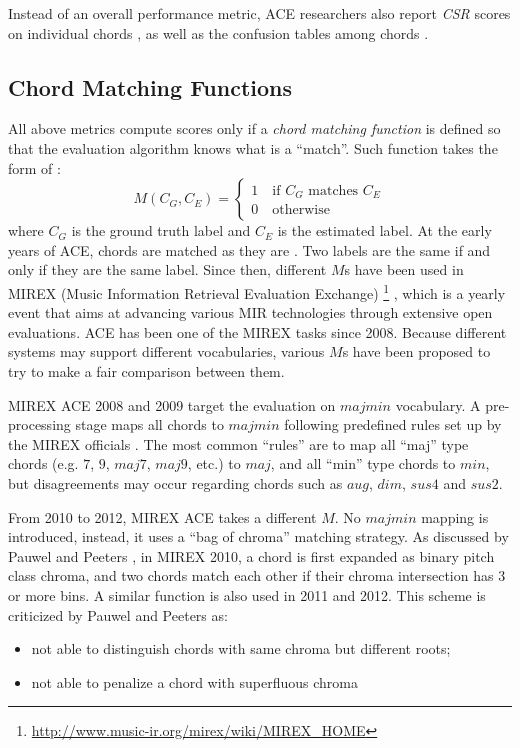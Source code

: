 Instead of an overall performance metric, ACE researchers also report \textit{CSR} scores on individual chords \cite{mauch2010automatic,deng2016chord}, as well as the confusion tables among chords \cite{mauch2010automatic,oudre2010template,papadopoulos2010joint,khadkevich2011music,deng2016hybrid}.

\subsection{Chord Matching Functions}\label{sec:2-chordmatch}
All above metrics compute scores only if a {\it chord matching function} is defined so that the evaluation algorithm knows what is a ``match''. Such function takes the form of \cite{harte2010towards}:
\begin{equation}
M(C_G,C_E)=
\begin{cases}
1 \quad \text{if $C_G$ matches $C_E$} \\
0 \quad \text{otherwise}
\end{cases}
\end{equation}
where $C_G$ is the ground truth label and $C_E$ is the estimated label. At the early years of ACE, chords are matched as they are \cite{fujishima1999realtime,sheh2003chord,bello2005robust}. Two labels are the same if and only if they are the same label. Since then, different $M$s have been used in MIREX (Music Information Retrieval Evaluation Exchange) \footnote{\url{http://www.music-ir.org/mirex/wiki/MIREX\_HOME}} \cite{downie2008music}, which is a yearly event that aims at advancing various MIR technologies through extensive open evaluations. ACE has been one of the MIREX tasks since 2008. Because different systems may support different vocabularies, various $M$s have been proposed to try to make a fair comparison between them.

MIREX ACE 2008 and 2009 target the evaluation on $majmin$ vocabulary. A pre-processing stage maps all chords to $majmin$ following predefined rules set up by the MIREX officials \cite{harte2010towards}. The most common ``rules'' are to map all ``maj'' type chords (e.g. $7$, $9$, $maj7$, $maj9$, etc.) to $maj$, and all ``min'' type chords to $min$, but disagreements may occur regarding chords such as $aug$, $dim$, $sus4$ and $sus2$.

From 2010 to 2012, MIREX ACE takes a different $M$. No $majmin$ mapping is introduced, instead, it uses a ``bag of chroma'' matching strategy. As discussed by Pauwel and Peeters \cite{pauwels2013evaluating}, in MIREX 2010, a chord is first expanded as binary pitch class chroma, and two chords match each other if their chroma intersection has 3 or more bins. A similar function is also used in 2011 and 2012. This scheme is criticized by Pauwel and Peeters \cite{pauwels2013evaluating} as:
\begin{itemize}
\item not able to distinguish chords with same chroma but different roots;
\item not able to penalize a chord with superfluous chroma
\end{itemize}

